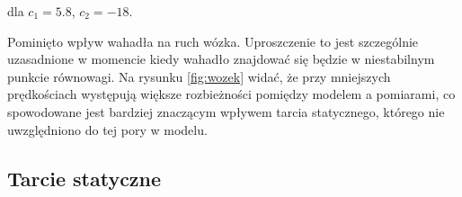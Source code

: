 dla $c_1 = 5.8$, $c_2 = -18$. 

Pominięto wpływ wahadła na ruch wózka. Uproszczenie to jest szczególnie uzasadnione w momencie kiedy wahadło znajdować się będzie w niestabilnym punkcie równowagi. Na rysunku \ref{fig:wozek} widać, że przy mniejszych prędkościach występują większe rozbieżności pomiędzy modelem a pomiarami, co spowodowane jest bardziej znaczącym wpływem tarcia statycznego, którego nie uwzględniono do tej pory w modelu.
\subsection{Tarcie statyczne}

